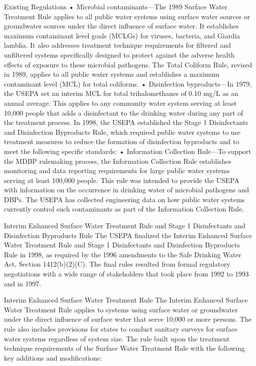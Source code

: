 \documentclass{article}
\begin{document}
Existing Regulations • Microbial contaminants---The 1989 Surface Water
Treatment Rule applies to all public water systems using surface water
sources or groundwater sources under the direct influence of surface
water. It establishes maximum contaminant level goals (MCLGs) for
viruses, bacteria, and Giardia lamblia. It also addresses treatment
technique requirements for filtered and unfiltered systems specifically
designed to protect against the adverse health effects of exposure to
these microbial pathogens. The Total Coliform Rule, revised in 1989,
applies to all public water systems and establishes a maximum
contaminant level (MCL) for total coliforms. • Disinfection
byproducts---In 1979, the USEPA set an interim MCL for total
trihalomethanes of 0.10 mg/L as an annual average. This applies to any
community water system serving at least 10,000 people that adds a
disinfectant to the drinking water during any part of the treatment
process. In 1998, the USEPA established the Stage 1 Disinfectants and
Disinfection Byproducts Rule, which required public water systems to use
treatment measures to reduce the formation of disinfection byproducts
and to meet the following specific standards: • Information Collection
Rule---To support the MDBP rulemaking process, the Information
Collection Rule establishes monitoring and data reporting requirements
for large public water systems serving at least 100,000 people. This
rule was intended to provide the USEPA with information on the
occurrence in drinking water of microbial pathogens and DBPs. The USEPA
has collected engineering data on how public water systems currently
control such contaminants as part of the Information Collection Rule.

Interim Enhanced Surface Water Treatment Rule and Stage 1 Disinfectants
and Disinfection Byproducts Rule The USEPA finalized the Interim
Enhanced Surface Water Treatment Rule and Stage 1 Disinfectants and
Disinfection Byproducts Rule in 1998, as required by the 1996 amendments
to the Safe Drinking Water Act, Section 1412(b)(2)(C). The final rules
resulted from formal regulatory negotiations with a wide range of
stakeholders that took place from 1992 to 1993 and in 1997.

Interim Enhanced Surface Water Treatment Rule The Interim Enhanced
Surface Water Treatment Rule applies to systems using surface water or
groundwater under the direct influence of surface water that serve
10,000 or more persons. The rule also includes provisions for states to
conduct sanitary surveys for surface water systems regardless of system
size. The rule built upon the treatment technique requirements of the
Surface Water Treatment Rule with the following key additions and
modifications:
\end{document}
